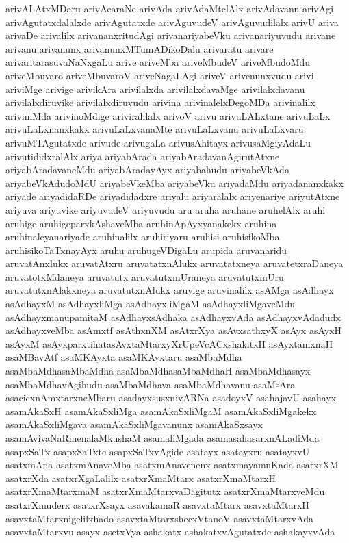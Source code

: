 {arivALAtxMDaru
arivAcaraNe
arivAda
arivAdaMtelAlx
arivAdavanu
arivAgi
arivAgutatxdalalxde
arivAgutatxde
arivAguvudeV
arivAguvudilalx
arivU
ariva
arivaDe
arivalilx
arivananxritudAgi
arivanariyabeVku
arivanariyuvudu
arivane
arivanu
arivanunx
arivanunxMTumADikoDalu
arivaratu
arivare
arivaritarasuvaNaNxgaLu
arive
ariveMba
ariveMbudeV
ariveMbudoMdu
ariveMbuvaro
ariveMbuvaroV
ariveNagaLAgi
ariveV
arivenunxvudu
arivi
ariviMge
arivige
arivikAra
arivilalxda
arivilalxdavaMge
arivilalxdavanu
arivilalxdiruvike
arivilalxdiruvudu
arivina
arivinalelxDegoMDa
arivinalilx
ariviniMda
arivinoMdige
ariviralilalx
arivoV
arivu
arivuLALxtane
arivuLaLx
arivuLaLxnanxkakx
arivuLaLxvanaMte
arivuLaLxvanu
arivuLaLxvaru
arivuMTAgutatxde
arivude
arivugaLa
arivusAhitayx
arivusaMgiyAdaLu
arivutididxralAlx
ariya
ariyabArada
ariyabAradavanAgirutAtxne
ariyabAradavaneMdu
ariyabAradayAyx
ariyabahudu
ariyabeVkAda
ariyabeVkAdudoMdU
ariyabeVkeMba
ariyabeVku
ariyadaMdu
ariyadananxkakx
ariyade
ariyadidaRDe
ariyadidadxre
ariyalu
ariyaralalx
ariyenariye
ariyutAtxne
ariyuva
ariyuvike
ariyuvudeV
ariyuvudu
aru
aruha
aruhane
aruhelAlx
aruhi
aruhige
aruhigeparxkAshaveMba
aruhinApAyxyanakekx
aruhina
aruhinaleyanariyade
aruhinalilx
aruhiriyaru
aruhisi
aruhisikoMba
aruhisikoTaTxnayAyx
aruhu
aruhugeVDigaLu
arupida
aruvanaridu
aruvatAnxlukx
aruvatAtxru
aruvatatxnAlukx
aruvatatxneya
aruvatetxraDaneya
aruvatotxMdaneya
aruvatutx
aruvatutxmUraneya
aruvatutxmUru
aruvatutxnAlakxneya
aruvatutxnAlukx
aruvige
aruvinalilx
asAMga
asAdhayx
asAdhayxM
asAdhayxliMga
asAdhayxliMgaM
asAdhayxliMgaveMdu
asAdhayxmanupamitaM
asAdhayxsAdhaka
asAdhayxvAda
asAdhayxvAdadudx
asAdhayxveMba
asAmxtf
asAthxnXM
asAtxrXya
asAvxsathxyX
asAyx
asAyxH
asAyxM
asAyxparxtihatasAvxtaMtarxyXrUpeVcACxshakitxH
asAyxtamxnaH
asaMBavAtf
asaMKAyxta
asaMKAyxtaru
asaMbaMdha
asaMbaMdhasaMbaMdha
asaMbaMdhasaMbaMdhaH
asaMbaMdhasayx
asaMbaMdhavAgihudu
asaMbaMdhava
asaMbaMdhavanu
asaMsAra
asacicxnAmxtarxneMbaru
asadayxsusxnivARNa
asadoyxV
asahajavU
asahayx
asamAkaSxH
asamAkaSxliMga
asamAkaSxliMgaM
asamAkaSxliMgakekx
asamAkaSxliMgava
asamAkaSxliMgavanunx
asamAkaSxsayx
asamAvivaNaRmenalaMkushaM
asamaliMgada
asamasahasarxnALadiMda
asapxSaTx
asapxSaTxte
asapxSaTxvAgide
asatayx
asatayxru
asatayxvU
asatxmAna
asatxmAnaveMba
asatxmAnavenenx
asatxmayamuKada
asatxrXM
asatxrXda
asatxrXgaLalilx
asatxrXmaMtarx
asatxrXmaMtarxH
asatxrXmaMtarxmaM
asatxrXmaMtarxvaDagitutx
asatxrXmaMtarxveMdu
asatxrXmuderx
asatxrXsayx
asavakamaR
asavxtaMtarx
asavxtaMtarxH
asavxtaMtarxnigelilxhado
asavxtaMtarxshecxVtanoV
asavxtaMtarxvAda
asavxtaMtarxvu
asayx
asetxVya
ashakatx
ashakatxvAgutatxde
ashakayxvAda
}
